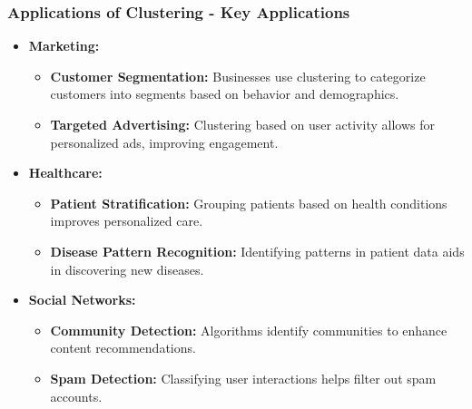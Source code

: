 \documentclass[aspectratio=169]{beamer}
\begin{document}
\begin{frame}[fragile]
    \frametitle{Applications of Clustering - Key Applications}
    \begin{itemize}
        \item \textbf{Marketing:}
            \begin{itemize}
                \item \textbf{Customer Segmentation:} 
                Businesses use clustering to categorize customers into segments based on behavior and demographics.
                \item \textbf{Targeted Advertising:}
                Clustering based on user activity allows for personalized ads, improving engagement.
            \end{itemize}
        
        \item \textbf{Healthcare:}
            \begin{itemize}
                \item \textbf{Patient Stratification:} 
                Grouping patients based on health conditions improves personalized care.
                \item \textbf{Disease Pattern Recognition:}
                Identifying patterns in patient data aids in discovering new diseases.
            \end{itemize}
        
        \item \textbf{Social Networks:}
            \begin{itemize}
                \item \textbf{Community Detection:} 
                Algorithms identify communities to enhance content recommendations.
                \item \textbf{Spam Detection:}
                Classifying user interactions helps filter out spam accounts.
            \end{itemize}
    \end{itemize}
\end{frame}
\end{document}
